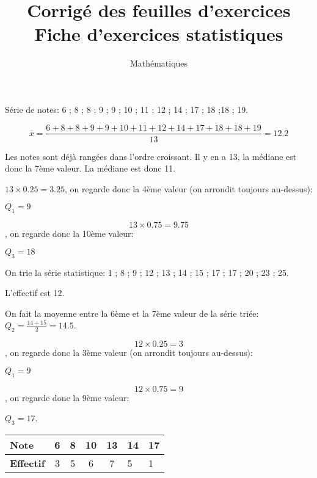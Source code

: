 \documentclass[a4paper,12pt]{scrartcl}
\date{}
\title{Corrigé des feuilles d'exercices \og Fiche d'exercices statistiques \fg{}}
\author{Mathématiques}
\begin{document}
\maketitle

\exo{}

Série de notes: 6 ; 8 ; 8 ; 9 ; 9 ; 10 ; 11 ; 12 ; 14 ; 17 ; 18 ;18 ; 19.


$$\bar{x} = \dfrac{6 + 8 + 8 + 9 + 9 + 10 + 11 + 12 + 14 + 17 + 18 +18 + 19}{13} = 12.2$$


Les notes sont déjà rangées dans l'ordre croissant. Il y en a 13, la médiane est donc la 7ème valeur. La médiane est donc 11. 


$13 \times 0.25 = 3.25$, on regarde donc la 4ème valeur (on arrondit toujours au-dessus):

$Q_1 = 9$


$$13 \times 0.75 = 9.75$$, on regarde donc la 10ème valeur:

$Q_3 = 18$

\exo{}

On trie la série statistique: 1 ; 8 ; 9 ; 12 ; 13 ; 14 ; 15 ; 17 ; 17 ; 20 ; 23 ; 25.

L'effectif est 12.


On fait la moyenne entre la 6ème et la 7ème valeur de la série triée: $Q_2 = \frac{14+15}{2} = 14.5$.


$$12 \times 0.25 = 3$$, on regarde donc la 3ème valeur (on arrondit toujours au-dessus):

$Q_1 = 9$


$$12 \times 0.75 = 9$$, on regarde donc la 9ème valeur:

$Q_3 = 17$.


\begin{tabular}{|l|l|l|l|l|l|l|}
\hline
\textbf{Note}     & 6                      & 8                      & 10                     & 13                     & 14 & 17 \\ \hline
\textbf{Effectif} & \multicolumn{1}{c|}{3} & \multicolumn{1}{c|}{5} & \multicolumn{1}{c|}{6} & \multicolumn{1}{c|}{7} & 5  & 1  \\ \hline
\end{tabular}
\end{document}
